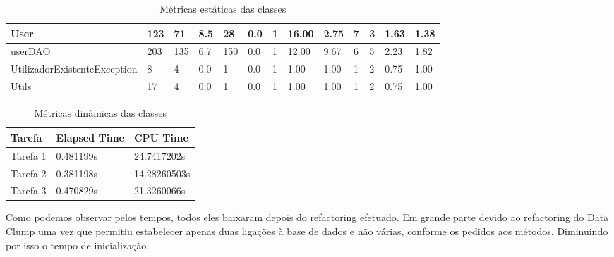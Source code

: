 \begin{table}[ht]
\begin{adjustbox}{width=1\textwidth}
\begin{tabular}{|l|l|l|l|l|l|l|l|l|l|l|l|l|}
User                         & 123          & 71         & 8.5             & 28       & 0.0            & 1       & 16.00           & 2.75                       & 7                   & 3                   & 1.63               & 1.38               \\ \hline
userDAO                      & 203          & 135        & 6.7             & 150      & 0.0            & 1       & 12.00           & 9.67                       & 6                   & 5                   & 2.23               & 1.82               \\ \hline
UtilizadorExistenteException & 8            & 4          & 0.0             & 1        & 0.0            & 1       & 1.00            & 1.00                       & 1                   & 2                   & 0.75               & 1.00               \\ \hline
Utils                        & 17           & 4          & 0.0             & 1        & 0.0            & 1       & 1.00            & 1.00                       & 1                   & 2                   & 0.75               & 1.00               \\ \hline
\end{tabular}
\end{adjustbox}
\caption{Métricas estáticas das classes}
\end{table}

\begin{table}[]
\centering
\begin{tabular}{|l|l|l|}
\hline
Tarefa   & Elapsed Time & CPU Time    \\ \hline
Tarefa 1 & 0.481199s    & 24.7417202s \\ \hline
Tarefa 2 & 0.381198s    & 14.28260503s \\ \hline
Tarefa 3 & 0.470829s    & 21.3260066s \\ \hline
\end{tabular}
\caption{Métricas dinâmicas das classes}
\end{table}

Como podemos observar pelos tempos, todos eles baixaram depois do refactoring efetuado. Em grande parte devido ao refactoring do Data Clump uma vez que permitiu estabelecer apenas duas ligações à base de dados e não várias, conforme os pedidos aos métodos. Diminuindo por isso o tempo de inicialização.